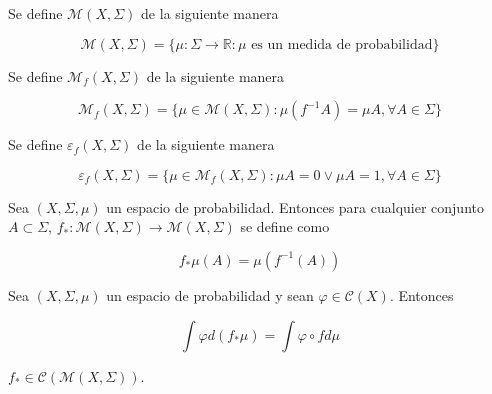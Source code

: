 \begin{definicion}
	Se define $\mathcal{M}(X,\Sigma)$ de la siguiente manera
	
	\begin{equation}
		\mathcal{M}(X,\Sigma) = \{\mu: \Sigma \rightarrow \mathbb{R}: \mu \text{ es un medida de probabilidad} \}
	\end{equation}
\end{definicion}

\begin{definicion}
	Se define $\mathcal{M}_f(X,\Sigma)$ de la siguiente manera
	
	\begin{equation}
		\mathcal{M}_f(X,\Sigma) = \{ \mu \in \mathcal{M}(X,\Sigma): \mu(f^{-1} A) = \mu A, \forall A \in \Sigma \}
	\end{equation}
\end{definicion}

\begin{definicion}
	Se define $\varepsilon_f(X,\Sigma)$ de la siguiente manera
	
	\begin{equation}
		\varepsilon_f(X,\Sigma) = \{ \mu \in \mathcal{M}_f(X,\Sigma): \mu A = 0 \vee \mu A = 1, \forall A \in \Sigma \}
	\end{equation}
\end{definicion}

\begin{definicion}
	Sea $(X,\Sigma,\mu)$ un espacio de probabilidad. Entonces para cualquier conjunto $A \subset \Sigma$, $f_*: \mathcal{M}(X,\Sigma) \rightarrow \mathcal{M}(X,\Sigma)$ se define como
	
	\begin{equation}
		f_*\mu(A) = \mu(f^{-1}(A))
	\end{equation}
\end{definicion}

\begin{lema}\label{lema1_krylov-bugoliubov}
	Sea $(X,\Sigma,\mu)$ un espacio de probabilidad y sean $\varphi \in \mathcal{C}(X)$. Entonces
	
	\begin{equation}
		\int \varphi d(f_*\mu)=\int \varphi \circ f d\mu
	\end{equation}
\end{lema}

\begin{lema}
	$f_* \in \mathcal{C}(\mathcal{M}(X,\Sigma))$. 
\end{lema}

